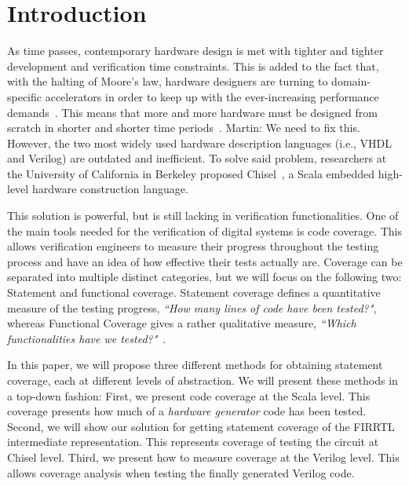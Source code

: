 \documentclass[conference]{IEEEtran}
\newcommand{\martin}[1]{{\color{blue} Martin: #1}}
\begin{document}

\section{Introduction}
\label{sec:objectives}
As time passes, contemporary hardware design is met with tighter and tighter development and verification time constraints. This is added to the fact that, with the halting of Moore's law, hardware designers are turning to domain-specific accelerators in order to keep up with the ever-increasing performance demands~\cite{henn-patt:turing:2019}. This means that more and more hardware must be designed from scratch in shorter and shorter time periods~\cite{domain-hw-acc:2020}. \martin{We need to fix this.} However, the two most widely used hardware description languages (i.e., VHDL and Verilog) are outdated and inefficient.  To solve said problem, researchers at the University of California in Berkeley proposed Chisel~\cite{chisel:dac2012}, a Scala embedded high-level hardware construction language.

This solution is powerful, but is still lacking in verification functionalities. One of the main tools needed for the verification of digital systems is code coverage. This allows verification engineers to measure their progress throughout the testing process and have an idea of how effective their tests actually are. Coverage can be separated into multiple distinct categories, but we will focus on the following two: Statement and functional coverage. Statement coverage defines a quantitative measure of the testing progress, \textit{``How many lines of code have been tested?"}, whereas Functional Coverage gives a rather qualitative measure, \textit{``Which functionalities have we tested?"}~\cite{spear2008systemverilog}.


In this paper, we will propose three different methods for obtaining statement coverage, each at different levels of abstraction. We will present these methods in a top-down fashion: First, we present code coverage at the Scala level. This coverage presents how much of a \emph{hardware generator} code has been tested. 
Second, we will show our solution for getting statement coverage of the FIRRTL intermediate representation. This represents coverage of testing the circuit at Chisel level. Third, we present how to measure coverage at the Verilog level. This allows coverage analysis when testing the finally generated Verilog code.
\end{document}
